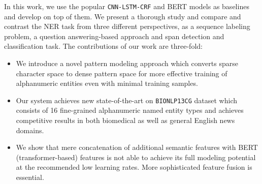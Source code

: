     

In this work, we use the popular \texttt{CNN-LSTM-CRF} and BERT models as baselines and develop on top of them. We present a thorough study and compare and contrast the NER task from three different perspectives, as a sequence labeling problem, a question answering-based approach and span detection and classification task. The contributions of our work are three-fold:

\begin{itemize}
    \item We introduce a novel pattern modeling approach which converts sparse character space to dense pattern space for more effective training of alphanumeric entities even with minimal training samples.
    
    \item Our system achieves new state-of-the-art on \texttt{BIONLP13CG} dataset which consists of 16 fine-grained alphanumeric named entity types and achieves competitive results in both biomedical as well as general English news domains.
    
    \item We show that mere concatenation of additional semantic features with BERT (transformer-based) features is not able to achieve its full modeling potential at the recommended low learning rates. More sophisticated feature fusion is essential.
\end{itemize}

